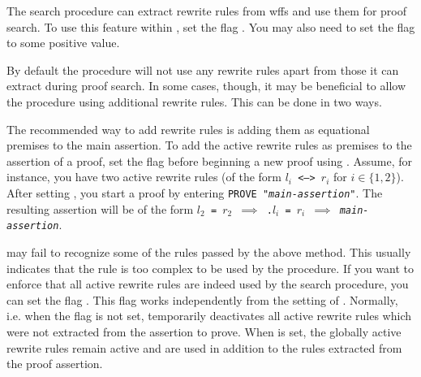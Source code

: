 The  search procedure can extract rewrite rules from wffs
and use them for proof search. To use this feature within , set
the flag . You may also need to set the flag
 to some positive value.

By default the procedure will not use any rewrite rules apart from those it
can extract during proof search. In some cases, though, it may be beneficial
to allow the procedure using additional rewrite rules. This can be done in two
ways.

The recommended way to add rewrite rules is adding them as equational premises
to the main assertion. To add the active rewrite rules as premises to the
assertion of a proof, set the flag  before beginning
a new proof using . Assume, for instance, you have two
active rewrite rules (of the form \mbox{\texttt{$l_i$ <--> $r_i$}} for
$i\in\{1,2\}$). After setting , you start a proof by
entering \texttt{PROVE "\textit{main-assertion}"}. The resulting assertion will
be of the form \texttt{$l_2$ = $r_2$ $\implies$ .$l_i$ = $r_i$ $\implies$ \textit{main-assertion}}.

 may fail to recognize some of the rules passed by the above
method. This usually indicates that the rule is too complex to be used by the
procedure.
If you want to enforce that all active rewrite rules are indeed used by the
search procedure, you can set the flag .
This flag works independently from the setting of .
Normally, i.e. when the flag is not set,  temporarily
deactivates all active rewrite rules which were not extracted from the
assertion to prove. When  is set, the
globally active rewrite rules remain active and are used in addition to the
rules extracted from the proof assertion.

